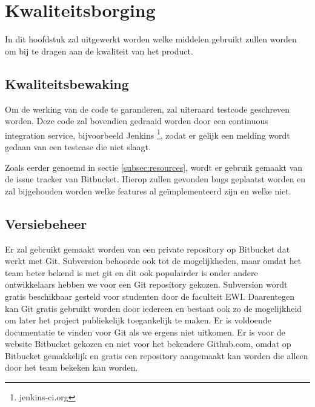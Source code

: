 \section{Kwaliteitsborging}
In dit hoofdstuk zal uitgewerkt worden welke middelen gebruikt zullen worden om bij te dragen aan de kwaliteit van het product.

\subsection{Kwaliteitsbewaking}
Om de werking van de code te garanderen, zal uiteraard testcode geschreven worden. Deze code zal bovendien gedraaid worden door een continuous integration service, bijvoorbeeld Jenkins \footnote{jenkins-ci.org}, zodat er gelijk een melding wordt gedaan van een testcase die niet slaagt.

Zoals eerder genoemd in sectie \ref{subsec:resources}, wordt er gebruik gemaakt van de issue tracker van Bitbucket. Hierop zullen gevonden bugs geplaatst worden en zal bijgehouden worden welke features al ge\"implementeerd zijn en welke niet.

\subsection{Versiebeheer}
Er zal gebruikt gemaakt worden van een private repository op Bitbucket dat werkt met Git. Subversion behoorde ook tot de mogelijkheden, maar omdat het team beter bekend is met git en dit ook populairder is onder andere ontwikkelaars hebben we voor een Git repository gekozen. Subversion wordt gratis beschikbaar gesteld voor studenten door de faculteit EWI. Daarentegen kan Git gratis gebruikt worden door iedereen en bestaat ook zo de mogelijkheid om later het project publiekelijk toegankelijk te maken. Er is voldoende documentatie te vinden voor Git als we ergens niet uitkomen. Er is voor de website Bitbucket gekozen en niet voor het bekendere Github.com, omdat op Bitbucket gemakkelijk en gratis een repository aangemaakt kan worden die alleen door het team bekeken kan worden. 
